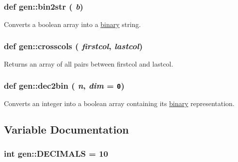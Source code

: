 \hypertarget{namespacegen_21553f88e5b189da2003268cfabb215f}{
\subsubsection[{bin2str}]{\setlength{\rightskip}{0pt plus 5cm}def gen::bin2str ( {\em b})}}
\label{namespacegen_21553f88e5b189da2003268cfabb215f}


Converts a boolean array into a \hyperlink{classgen_1_1binary}{binary} string. 

\hypertarget{namespacegen_287d3a33d4580585adcc84c10c39082a}{
\subsubsection[{crosscols}]{\setlength{\rightskip}{0pt plus 5cm}def gen::crosscols ( {\em firstcol}, \/   {\em lastcol})}}
\label{namespacegen_287d3a33d4580585adcc84c10c39082a}


Returns an array of all pairs between firstcol and lastcol. 

\hypertarget{namespacegen_804c568d405e9b3b8234ca18666fd0e3}{
\subsubsection[{dec2bin}]{\setlength{\rightskip}{0pt plus 5cm}def gen::dec2bin ( {\em n}, \/   {\em dim} = {\tt 0})}}
\label{namespacegen_804c568d405e9b3b8234ca18666fd0e3}


Converts an integer into a boolean array containing its \hyperlink{classgen_1_1binary}{binary} representation. 



\subsection{Variable Documentation}
\hypertarget{namespacegen_283eb6a0f532506a7be95ca53d71ef06}{
\subsubsection[{DECIMALS}]{\setlength{\rightskip}{0pt plus 5cm}int {\bf gen::DECIMALS} = 10}}
\label{namespacegen_283eb6a0f532506a7be95ca53d71ef06}


